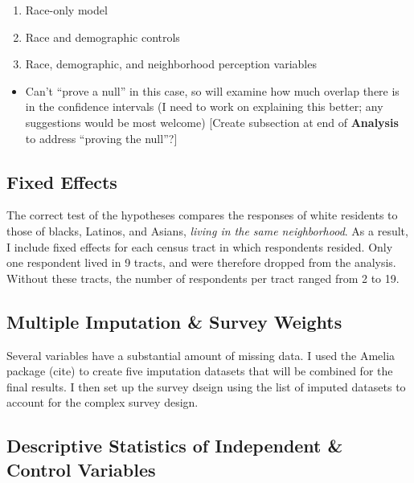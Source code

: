 \documentclass[]{article}
\providecommand{\tightlist}{%
  \setlength{\itemsep}{0pt}\setlength{\parskip}{0pt}}
\theoremstyle{definition}
\theoremstyle{definition}
\theoremstyle{definition}
\theoremstyle{remark}
\begin{document}
\begin{enumerate}
\def\labelenumi{\arabic{enumi}.}
\tightlist
\item
  Race-only model
\item
  Race and demographic controls
\item
  Race, demographic, and neighborhood perception variables
\end{enumerate}

\begin{itemize}
\tightlist
\item
  Can't ``prove a null'' in this case, so will examine how much overlap
  there is in the confidence intervals (I need to work on explaining
  this better; any suggestions would be most welcome) {[}Create
  subsection at end of \textbf{Analysis} to address ``proving the
  null''?{]}
\end{itemize}

\subsection{Fixed Effects}\label{fixed-effects}

The correct test of the hypotheses compares the responses of white
residents to those of blacks, Latinos, and Asians, \emph{living in the
same neighborhood}. As a result, I include fixed effects for each census
tract in which respondents resided. Only one respondent lived in 9
tracts, and were therefore dropped from the analysis. Without these
tracts, the number of respondents per tract ranged from 2 to 19.

\subsection{Multiple Imputation \& Survey
Weights}\label{multiple-imputation-survey-weights}

Several variables have a substantial amount of missing data. I used the
Amelia package (cite) to create five imputation datasets that will be
combined for the final results. I then set up the survey dseign using
the list of imputed datasets to account for the complex survey design.

\subsection{Descriptive Statistics of Independent \& Control
Variables}\label{descriptive-statistics-of-independent-control-variables}


\end{document}
